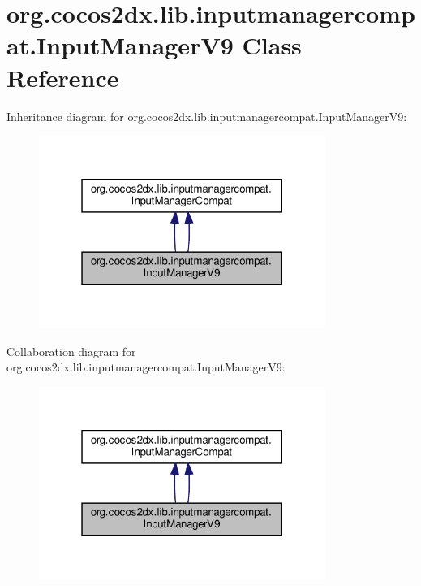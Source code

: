 \hypertarget{classorg_1_1cocos2dx_1_1lib_1_1inputmanagercompat_1_1InputManagerV9}{}\section{org.\+cocos2dx.\+lib.\+inputmanagercompat.\+Input\+Manager\+V9 Class Reference}
\label{classorg_1_1cocos2dx_1_1lib_1_1inputmanagercompat_1_1InputManagerV9}


Inheritance diagram for org.\+cocos2dx.\+lib.\+inputmanagercompat.\+Input\+Manager\+V9\+:
\nopagebreak
\begin{figure}[H]
\begin{center}
\leavevmode
\includegraphics[width=265pt]{classorg_1_1cocos2dx_1_1lib_1_1inputmanagercompat_1_1InputManagerV9__inherit__graph}
\end{center}
\end{figure}


Collaboration diagram for org.\+cocos2dx.\+lib.\+inputmanagercompat.\+Input\+Manager\+V9\+:
\nopagebreak
\begin{figure}[H]
\begin{center}
\leavevmode
\includegraphics[width=265pt]{classorg_1_1cocos2dx_1_1lib_1_1inputmanagercompat_1_1InputManagerV9__coll__graph}
\end{center}
\end{figure}
